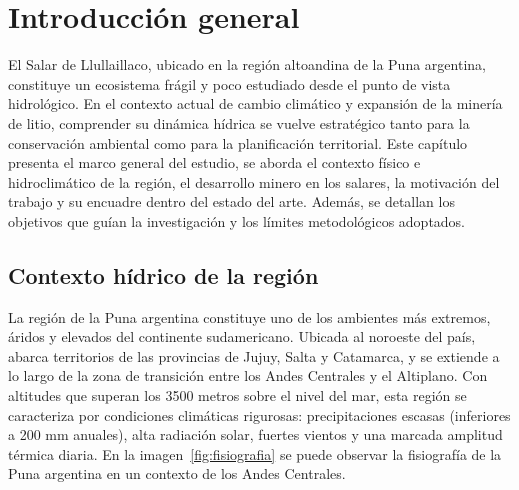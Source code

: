 
\chapter{Introducción general} %

\label{Chapter1} %
\label{IntroGeneral}


\newcommand{\keyword}[1]{\textbf{#1}}
\newcommand{\tabhead}[1]{\textbf{#1}}
\newcommand{\code}[1]{\texttt{#1}}
\newcommand{\file}[1]{\texttt{\bfseries#1}}
\newcommand{\option}[1]{\texttt{\itshape#1}}
\newcommand{\grados}{$^{\circ}$}




El Salar de Llullaillaco, ubicado en la región altoandina de la Puna argentina, constituye un ecosistema frágil y poco estudiado desde el punto de vista hidrológico. En el contexto actual de cambio climático y expansión de la minería de litio, comprender su dinámica hídrica se vuelve estratégico tanto para la conservación ambiental como para la planificación territorial. Este capítulo presenta el marco general del estudio, se aborda el contexto físico e hidroclimático de la región, el desarrollo minero en los salares, la motivación del trabajo y su encuadre dentro del estado del arte. Además, se detallan los objetivos que guían la investigación y los límites metodológicos adoptados.


\section{Contexto hídrico de la región}


La región de la Puna argentina constituye uno de los ambientes más extremos, áridos y elevados del continente sudamericano. Ubicada al noroeste del país, abarca territorios de las provincias de Jujuy, Salta y Catamarca, y se extiende a lo largo de la zona de transición entre los Andes Centrales y el Altiplano. Con altitudes que superan los 3500 metros sobre el nivel del mar, esta región se caracteriza por condiciones climáticas rigurosas: precipitaciones escasas (inferiores a 200 mm anuales), alta radiación solar, fuertes vientos y una marcada amplitud térmica diaria. En la imagen~\ref{fig:fisiografia} se puede observar la fisiografía de la Puna argentina en un contexto de los Andes Centrales. 

